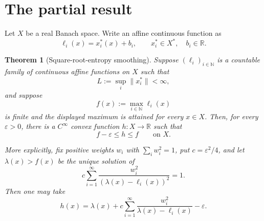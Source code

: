 \documentclass[11pt]{article}
\newtheorem{theorem}{Theorem}
\newcommand{\R}{\mathbb{R}}
\newcommand{\N}{\mathbb{N}}
\newcommand{\eps}{\varepsilon}
\begin{document}
\section{The partial result}

Let $X$ be a real Banach space.  Write an affine continuous function as
\[
  \ell_i(x)=x_i^*(x)+b_i,
  \qquad x_i^*\in X^*,\quad b_i\in\R.
\]

\begin{theorem}[Square-root-entropy smoothing]\label{thm:main}
Suppose $(\ell_i)_{i\in\N}$ is a countable family of continuous affine
functions on $X$ such that
\[
  L:=\sup_i\|x_i^*\|<\infty,
\]
and suppose
\[
  f(x):=\max_{i\in\N}\ell_i(x)
\]
is finite and the displayed maximum is attained for every $x\in X$.  Then,
for every $\eps>0$, there is a $C^\infty$ convex function $h:X\to\R$ such
that
\[
  f-\eps\leq h\leq f
  \qquad\text{on }X.
\]

More explicitly, fix positive weights $w_i$ with
$\sum_iw_i^2=1$, put $c=\eps^2/4$, and let $\lambda(x)>f(x)$ be the unique
solution of
\begin{equation}\label{eq:lambda}
  c\sum_{i=1}^{\infty}
  \frac{w_i^2}{(\lambda(x)-\ell_i(x))^2}=1.
\end{equation}
Then one may take
\begin{equation}\label{eq:h}
  h(x)=\lambda(x)+c\sum_{i=1}^{\infty}
  \frac{w_i^2}{\lambda(x)-\ell_i(x)}-\eps.
\end{equation}
\end{theorem}
\end{document}
